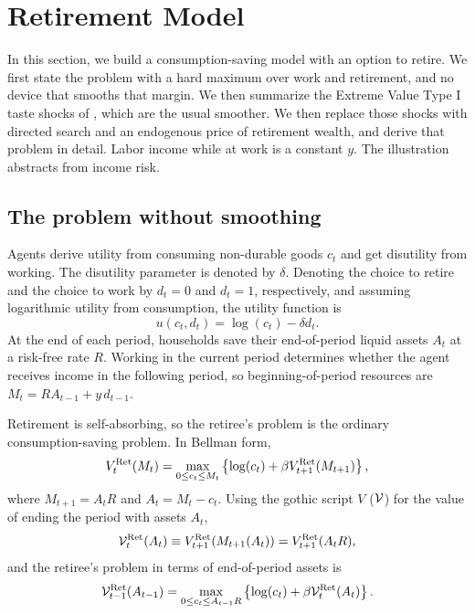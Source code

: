 \section{Retirement Model}\label{sec:RetirementModel}
In this section, we build a consumption-saving model with an option to retire. We first
state the problem with a hard maximum over work and retirement, and no device that
smooths that margin. We then summarize the Extreme Value Type I taste shocks of
\citet{Iskhakov2017-jb}, which are the usual smoother. We then replace those shocks
with directed search and an endogenous price of retirement wealth, and derive that
problem in detail. Labor income while at work is a constant $y$. The illustration
abstracts from income risk.

\subsection{The problem without smoothing}
Agents derive utility from consuming non-durable goods $c_t$ and get disutility from
working. The disutility parameter is denoted by $\delta$. Denoting the choice to retire and
the choice to work by $d_t = 0$ and $d_t = 1$, respectively, and assuming logarithmic utility
from consumption, the utility function is
\begin{equation}
u(c_t, d_t) = \log(c_t) - \delta d_t.
\end{equation}
At the end of each period, households save their end-of-period liquid assets $A_t$ at a
risk-free rate $R$. Working in the current period determines whether the agent receives
income in the following period, so beginning-of-period resources are
$M_t = R A_{t-1} + y\, d_{t-1}$.

Retirement is self-absorbing, so the retiree's problem is the ordinary consumption-saving
problem. In Bellman form,
\begin{equation}
V_t^{\mathrm{Ret}}(M_t) = \max_{0 \le c_t \le M_t}
\left\{ \log(c_t) + \beta V_{t+1}^{\mathrm{Ret}}(M_{t+1}) \right\},
\end{equation}
where $M_{t+1} = A_t R$ and $A_t = M_t - c_t$. Using the gothic script $V$ ($\mathcal{V}$) for the
value of ending the period with assets $A_t$,
\begin{equation}
\mathcal{V}_t^{\mathrm{Ret}}(A_t) \equiv V_{t+1}^{\mathrm{Ret}}(M_{t+1}(A_t)) = V_{t+1}^{\mathrm{Ret}}(A_t R),
\end{equation}
and the retiree's problem in terms of end-of-period assets is
\begin{equation}
\mathcal{V}_{t-1}^{\mathrm{Ret}}(A_{t-1}) = \max_{0 \le c_t \le A_{t-1} R}
\left\{ \log(c_t) + \beta \mathcal{V}_t^{\mathrm{Ret}}(A_t) \right\}.
\end{equation}

